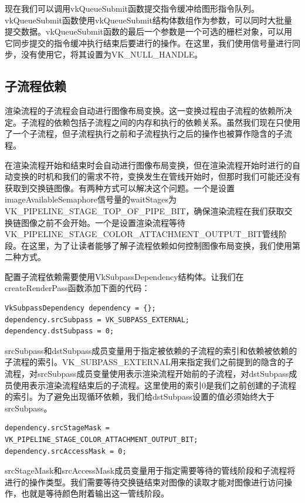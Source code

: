 \documentclass{ctexart}
\begin{document}
现在我们可以调用vkQueueSubmit函数提交指令缓冲给图形指令队列。vkQueueSubmit函数使用vkQueueSubmit结构体数组作为参数，可以同时大批量提交数据。vkQueueSubmit函数的最后一个参数是一个可选的栅栏对象，可以用它同步提交的指令缓冲执行结束后要进行的操作。在这里，我们使用信号量进行同步，没有使用它，将其设置为VK\_NULL\_HANDLE。

\subsection{子流程依赖}

渲染流程的子流程会自动进行图像布局变换。这一变换过程由子流程的依赖所决定。子流程的依赖包括子流程之间的内存和执行的依赖关系。虽然我们现在只使用了一个子流程，但子流程执行之前和子流程执行之后的操作也被算作隐含的子流程。

在渲染流程开始和结束时会自动进行图像布局变换，但在渲染流程开始时进行的自动变换的时机和我们的需求不符，变换发生在管线开始时，但那时我们可能还没有获取到交换链图像。有两种方式可以解决这个问题。一个是设置imageAvailableSemaphore信号量的waitStages为VK\_PIPELINE\_STAGE\_TOP\_OF\_PIPE\_BIT，确保渲染流程在我们获取交换链图像之前不会开始。一个是设置渲染流程等待VK\_PIPELINE\_STAGE\_COLOR\_ATTACHMENT\_OUTPUT\_BIT管线阶段。在这里，为了让读者能够了解子流程依赖如何控制图像布局变换，我们使用第二种方式。

配置子流程依赖需要使用VkSubpassDependency结构体。让我们在createRenderPass函数添加下面的代码：

\begin{lstlisting}[language={[ANSI]C}]
VkSubpassDependency dependency = {};
dependency.srcSubpass = VK_SUBPASS_EXTERNAL;
dependency.dstSubpass = 0;
\end{lstlisting}

srcSubpass和dstSubpass成员变量用于指定被依赖的子流程的索引和依赖被依赖的子流程的索引。VK\_SUBPASS\_EXTERNAL用来指定我们之前提到的隐含的子流程，对srcSubpass成员变量使用表示渲染流程开始前的子流程，对dstSubpass成员使用表示渲染流程结束后的子流程。这里使用的索引0是我们之前创建的子流程的索引。为了避免出现循环依赖，我们给dstSubpass设置的值必须始终大于srcSubpass。

\begin{lstlisting}[language={[ANSI]C}]
dependency.srcStageMask = VK_PIPELINE_STAGE_COLOR_ATTACHMENT_OUTPUT_BIT;
dependency.srcAccessMask = 0;
\end{lstlisting}

srcStageMask和srcAccessMask成员变量用于指定需要等待的管线阶段和子流程将进行的操作类型。我们需要等待交换链结束对图像的读取才能对图像进行访问操作，也就是等待颜色附着输出这一管线阶段。
\end{document}
